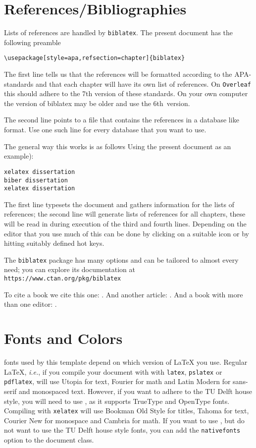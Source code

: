 

\section{References/Bibliographies}

Lists of references are handled by \texttt{biblatex}.
The present document has the following preamble
\begin{verbatim}
\usepackage[style=apa,refsection=chapter]{biblatex}

\end{verbatim}
The first line tells us that the references will be formatted according to 
the APA-standards and that each chapter will have its own list of references.
On \texttt{Overleaf} this should adhere to the 7th version of these 
standards.
On your own computer the version of biblatex may be older and 
use the 6th~version.

The second line points to a file that contains the references in a database
like format.
Use one such line for every database that you want to use.

The general way this works is as follows Using the present document as 
an example):
\begin{verbatim}
xelatex dissertation
biber dissertation
xelatex dissertation
\end{verbatim}
The first line typesets the document and gathers information for the lists
of references; the second line will generate lists of references for all 
chapters, these will be read in during execution of the third and fourth lines.
Depending on the editor that you use much of this can be done by clicking
on a suitable icon or by hitting suitably defined hot keys.

The \texttt{biblatex} package has many options and can be tailored to almost
every need; you can explore its documentation at
\texttt{https://www.ctan.org/pkg/biblatex}

To cite a book we cite this one: \cite{MR1039321}.
And another article: \cite{MR3860876}.
And a book with more than one editor: \cite{MR3204729}.




\section{Fonts and Colors}

 fonts used by this template depend on which version of \LaTeX{} you use. Regular \LaTeX, \emph{i.e.}, if you compile your document with with \texttt{latex}, \texttt{pslatex} or \texttt{pdflatex}, will use Utopia for text, Fourier for math and Latin Modern for sans-serif and monospaced text. However, if you want to adhere to the TU Delft house style, you will need to use \XeLaTeX, as it supports TrueType and OpenType fonts. Compiling with \texttt{xelatex} will use Bookman Old Style for titles, Tahoma for text, Courier New for monospace and Cambria for math. If you want to use \XeLaTeX, but do not want to use the TU Delft house style fonts, you can add the \texttt{nativefonts} option to the document class.

